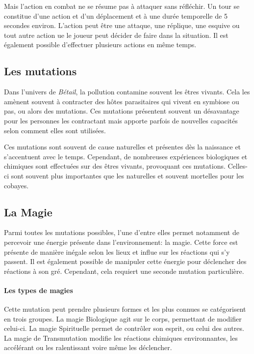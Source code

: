 Mais l'action en combat ne se résume pas à attaquer sans réfléchir. Un tour se constitue d'une action et d'un déplacement et à une durée temporelle de 5 secondes environ. L'action peut être une attaque, une réplique, une esquive ou tout autre action ue le joueur peut décider de faire dans la situation. Il est également possible d'effectuer plusieurs actions en même temps.

\subsection{Les mutations}

Dans l'univers de \emph{Bétail}, la pollution contamine souvent les êtres vivants. Cela les amènent souvent à contracter des hôtes parasitaires qui vivent en symbiose ou pas, ou alors des mutations. Ces mutations présentent souvent un désavantage pour les personnes les contractant mais apporte parfois de nouvelles capacités selon comment elles sont utilisées. 

Ces mutations sont souvent de cause naturelles et présentes dès la naissance et s'accentuent avec le temps. Cependant, de nombreuses expériences biologiques et chimiques sont effectuées sur des êtres vivants, provoquant ces mutations. Celles-ci sont souvent plus importantes que les naturelles et souvent mortelles pour les cobayes.

\subsection{La Magie}

Parmi toutes les mutations possibles, l'une d'entre elles permet notamment de percevoir une énergie présente dans l'environnement: la magie. Cette force est présente de manière inégale selon les lieux et influe sur les réactions qui s'y passent. Il est également possible de manipuler cette énergie pour déclencher des réactions à son gré. Cependant, cela requiert une seconde mutation particulière. 

\paragraph{Les types de magies}
Cette mutation peut prendre plusieurs formes et les plus connues se catégorisent en trois groupes. La magie Biologique agit sur le corps, permettant de modifier celui-ci. La magie Spirituelle permet de contrôler son esprit, ou celui des autres. La magie de Transmutation modifie les réactions chimiques environnantes, les accélérant ou les ralentissant voire même les déclencher. 